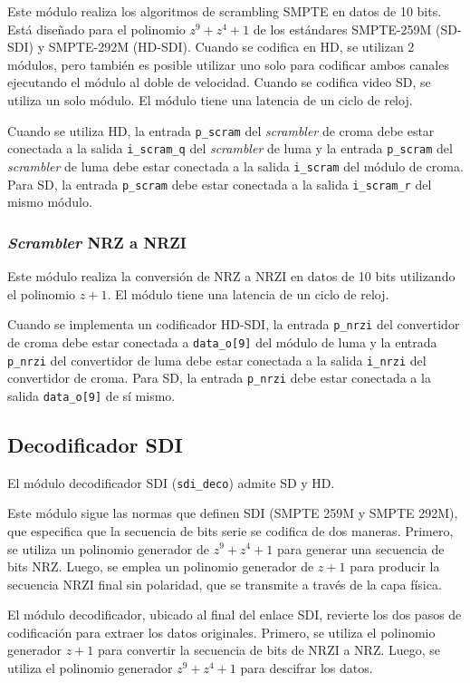 Este módulo realiza los algoritmos de scrambling SMPTE en datos de 10 bits.
Está diseñado para el polinomio $z^9+z^4+1$ de los estándares SMPTE-259M
(SD-SDI) y SMPTE-292M (HD-SDI). Cuando se codifica en HD, se utilizan 2 módulos,
pero también es posible utilizar uno solo para codificar ambos canales
ejecutando el módulo al doble de velocidad. Cuando se codifica video SD, se utiliza
un solo módulo. El módulo tiene una latencia de un ciclo de reloj.

Cuando se utiliza HD, la entrada \texttt{p\_scram} del \textit{scrambler} de croma debe
estar conectada a la salida \texttt{i\_scram\_q} del \textit{scrambler} de luma y la entrada
\texttt{p\_scram} del \textit{scrambler} de luma debe estar conectada a la salida
\texttt{i\_scram} del módulo de croma. Para SD, la entrada \texttt{p\_scram} debe
estar conectada a la salida \texttt{i\_scram\_r} del mismo módulo.

\subsubsection{\textit{Scrambler} NRZ a NRZI}

Este módulo realiza la conversión de NRZ a NRZI en datos de 10 bits utilizando el
polinomio $z+1$. El módulo tiene una latencia de un ciclo de reloj.

Cuando se implementa un codificador HD-SDI, la entrada \texttt{p\_nrzi} del
convertidor de croma debe estar conectada a \texttt{data\_o[9]} del módulo de luma
y la entrada \texttt{p\_nrzi} del convertidor de luma debe estar conectada a la
salida \texttt{i\_nrzi} del convertidor de croma. Para SD, la entrada
\texttt{p\_nrzi} debe estar conectada a la salida \texttt{data\_o[9]} de sí mismo.

\subsection{Decodificador SDI}

El módulo decodificador SDI (\texttt{sdi\_deco}) admite SD y HD\@.

Este módulo sigue las normas que definen SDI (SMPTE 259M y SMPTE 292M), que
especifica que la secuencia de bits serie se codifica de dos maneras. Primero,
se utiliza un polinomio generador de $z^9+z^4+1$ para generar una secuencia de
bits NRZ\@. Luego, se emplea un polinomio generador de $z+1$ para producir la
secuencia NRZI final sin polaridad, que se transmite a través de la capa física.

El módulo decodificador, ubicado al final del enlace SDI, revierte los dos pasos
de codificación para extraer los datos originales. Primero, se utiliza el
polinomio generador $z+1$ para convertir la secuencia de bits de NRZI a NRZ\@.
Luego, se utiliza el polinomio generador $z^9+z^4+1$ para descifrar los datos.

